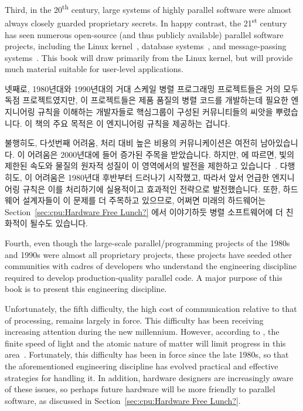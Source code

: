 Third, in the 20\textsuperscript{th} century, large systems of
highly parallel software were almost always closely guarded proprietary
secrets.
In happy contrast, the 21\textsuperscript{st} century has seen numerous
open-source (and thus publicly available) parallel software projects,
including the Linux kernel~\cite{Torvalds2.6kernel},
database systems~\cite{PostgreSQL2008,MySQL2008},
and message-passing systems~\cite{OpenMPI2008,BOINC2008}.
This book will draw primarily from the Linux kernel, but will
provide much material suitable for user-level applications.

\fi

넷째로, 1980년대와 1990년대의 거대 스케일 병렬 프로그래밍 프로젝트들은 거의
모두 독점 프로젝트였지만, 이 프로젝트들은 제품 품질의 병렬 코드를 개발하는데
필요한 엔지니어링 규칙을 이해하는 개발자들로 핵심그룹이 구성된 커뮤니티들의
씨앗을 뿌렸습니다.
이 책의 주요 목적은 이 엔지니어링 규칙을 제공하는 겁니다.

불행히도, 다섯번째 어려움, 처리 대비 높은 비용의 커뮤니케이션은 여전히
남아있습니다.
이 어려움은 2000년대에 들어 증가된 주목을 받았습니다.
하지만,  에 따르면, 빛의 제한된 속도와 물질의 원자적
성질이 이 영역에서의 발전을 제한하고
있습니다~\cite{BryanGardiner2007,GordonMoore03a}.
다행히도, 이 어려움은 1980년대 후반부터 드러나기 시작했고, 따라서 앞서 언급한
엔지니어링 규칙은 이를 처리하기에 실용적이고 효과적인 전략으로 발전했습니다.
또한, 하드웨어 설계자들이 이 문제를 더 주목하고 있으므로, 어쩌면 미래의
하드웨어는 Section~\ref{sec:cpu:Hardware Free Lunch?} 에서 이야기하듯 병렬
소프트웨어에 더 친화적이 될수도 있습니다.

\iffalse

Fourth, even though the large-scale parallel\-/programming projects of
the 1980s and 1990s were almost all proprietary projects, these
projects have seeded other communities with cadres of developers who
understand the engineering discipline required to develop production-quality
parallel code.
A major purpose of this book is to present this engineering discipline.

Unfortunately, the fifth difficulty, the high cost of communication
relative to that of processing, remains largely in force.
This difficulty has been receiving increasing attention during
the new millennium.
However, according to ,
the finite speed of light and the atomic
nature of matter will limit progress in this
area~\cite{BryanGardiner2007,GordonMoore03a}.
Fortunately, this difficulty has been in force since the late 1980s,
so that the aforementioned engineering discipline has evolved practical
and effective strategies for handling it.
In addition, hardware designers are increasingly aware of these issues,
so perhaps future hardware will be more friendly to parallel software,
as discussed in Section~\ref{sec:cpu:Hardware Free Lunch?}.

